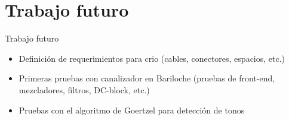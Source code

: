 \documentclass[ignorenonframetext,12pt]{beamer}
\begin{document}
\section{Trabajo futuro}
\begin{frame}{Trabajo futuro}
				\begin{itemize}
								\item Definici\'on de requerimientos para crio (cables,
												conectores, espacios, etc.)
								\item Primeras pruebas con canalizador en Bariloche (pruebas de
												front-end, mezcladores, filtros, DC-block, etc.)
								\item Pruebas con el algoritmo de Goertzel para detección de
												tonos
				\end{itemize}
\end{frame}
%
%
%
%
%
%
%
%
%
%
%
%
%
\end{document}
